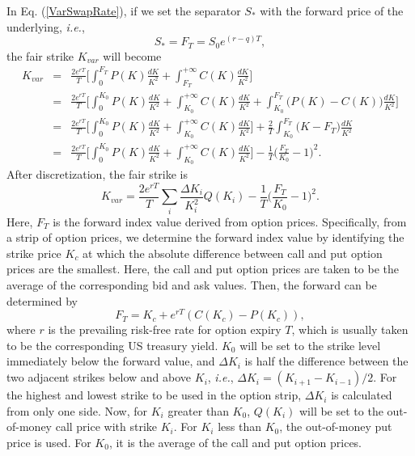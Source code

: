 \documentclass[12pt]{article}
\begin{document}
    In Eq. (\ref{VarSwapRate}), if we set the separator $S_*$ with the forward price of the underlying, {\it i.e.},
    \begin{equation}
      S_*=F_T=S_0e^{(r-q)T},
    \end{equation}
    the fair strike $K_{var}$ will become
    \begin{eqnarray}
      K_{var} &=& \frac{2e^{rT}}{T}\Bigg[\int_0^{F_T}P(K)\frac{dK}{K^2}+\int_{F_T}^{+\infty}C(K)\frac{dK}{K^2}\Bigg]\nonumber\\
              &=& \frac{2e^{rT}}{T}\Bigg[\int_0^{K_0}P(K)\frac{dK}{K^2}+\int_{K_0}^{+\infty}C(K)\frac{dK}{K^2}
                                        +\int_{K_0}^{F_T}\bigg(P(K)-C(K)\bigg)\frac{dK}{K^2}\Bigg]\nonumber\\
              &=& \frac{2e^{rT}}{T}\Bigg[\int_0^{K_0}P(K)\frac{dK}{K^2}+\int_{K_0}^{+\infty}C(K)\frac{dK}{K^2}\Bigg]
                              +\frac{2}{T}\int_{K_0}^{F_T}\bigg(K-F_T\bigg)\frac{dK}{K^2}\nonumber\\
              &=& \frac{2e^{rT}}{T}\Bigg[\int_0^{K_0}P(K)\frac{dK}{K^2}+\int_{K_0}^{+\infty}C(K)\frac{dK}{K^2}\Bigg]
                              -\frac{1}{T}\bigg(\frac{F_T}{K_0}-1\bigg)^2.
    \end{eqnarray}
    After discretization, the fair strike is
    \begin{equation}
       K_{var} = \frac{2e^{rT}}{T}\sum_i\frac{\Delta K_i}{K_i^2}Q(K_i)-\frac{1}{T}\bigg(\frac{F_T}{K_0}-1\bigg)^2.
    \end{equation}
    Here, $F_T$ is the forward index value derived from option prices. Specifically, from a strip of option prices,
    we determine the forward index value by identifying the strike price $K_c$ at which the absolute difference between
    call and put option prices are the smallest. Here, the call and put option prices are taken to be the average of
    the corresponding bid and ask values. Then, the forward can be determined by
    \begin{equation}
      F_T = K_c + e^{rT}\left(C(K_c)-P(K_c)\right),
    \end{equation}
    where $r$ is the prevailing risk-free rate for option expiry $T$, which is usually taken to be the corresponding
    US treasury yield. $K_0$ will be set to the strike level immediately below the forward value, and $\Delta K_i$ is
    half the difference between the two adjacent strikes below and above $K_i$, {\it i.e.}, $\Delta K_i=(K_{i+1}-K_{i-1})/2$.
    For the highest and lowest strike to be used in the option strip, $\Delta K_i$ is calculated from only one side.
    Now, for $K_i$ greater than $K_0$, $Q(K_i)$ will be set to the out-of-money call price with strike $K_i$. For $K_i$
    less than $K_0$, the out-of-money put price is used. For $K_0$, it is the average of the call and put option prices.
\end{document}
